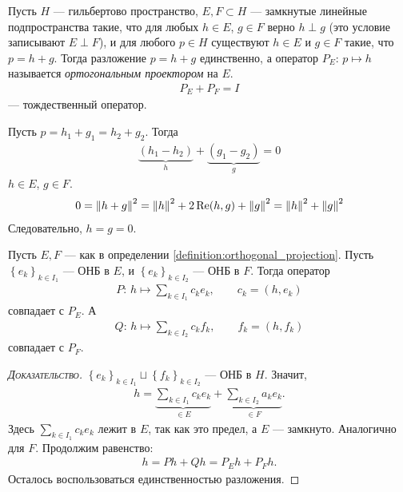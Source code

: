 \documentclass[../complex-analysis.tex]{subfiles}
\begin{document}
\begin{df}
 \label{definition:orthogonal_projection}
 Пусть $ H $ --- гильбертово пространство, $ E, F \subset H $ --- замкнутые линейные подпространства такие, что для любых $ h \in E $, $ g \in F $ верно $ h \perp g $ (это условие записывают $ E \perp F $), и для любого $ p \in H $ существуют $ h \in E $ и $ g \in F $ такие, что $ p = h + g $. Тогда разложение $ p = h + g $ единственно, а оператор $ P_E \colon\, p \mapsto h $ называется \textit{ортогональным проектором} на $ E $.
 \begin{align*}
  P_E + P_F = I
 \end{align*} --- тождественный оператор.
\end{df}
\begin{remrk}
 Пусть $ p = h_1 + g_1 = h_2 + g_2 $. Тогда
 \begin{align*}
  \underbrace{(h_1 - h_2)}_h + \underbrace{(g_1-g_2)}_g = 0
 \end{align*} $ h \in E $, $ g \in F $.
 \begin{align*}
  0 = \left\| h+g \right\|^{2} = \left\| h \right\|^{2} + 2 \operatorname{Re} (h,g) + \left\| g \right\|^{2} = \left\| h \right\|^{2} + \left\| g \right\|^{2}
 \end{align*} Следовательно, $ h=g=0 $.
\end{remrk}

\begin{thm}
  Пусть $ E,F $ --- как в определении \eqref{definition:orthogonal_projection}. Пусть $ \left\{e_k\right\}_{k\in I_1}  $ --- ОНБ в $ E $, и $ \left\{e_k\right\}_{k\in I_2}  $ --- ОНБ в $ F $. Тогда оператор \begin{align*}
  P \colon\, h \mapsto \sum_{k\in I_1} c_ke_k, \qquad c_k=(h,e_k)
 \end{align*} совпадает с $ P_E $. А
 \begin{align*}
  Q \colon\, h \mapsto \sum_{k \in I_2} c_kf_k, \qquad f_k=(h,f_k)
 \end{align*} совпадает с $ P_F $.
\end{thm}
\begin{proof}[\normalfont\textsc{Доказательство}]
 $ \left\{e_k\right\}_{k \in I_1} \sqcup \left\{f_k\right\}_{k \in I_2}  $ --- ОНБ в $ H $. Значит,
 \begin{align*}
  h = \underbrace{\sum_{k\in I_1}c_k e_k}_{\in E} + \underbrace{\sum_{k \in I_2} a_k e_k}_{\in F}.
 \end{align*} Здесь $ \sum_{k\in I_1}c_ke_k  $ лежит в $ E $, так как это предел, а $ E $ --- замкнуто. Аналогично для $ F $. Продолжим равенство:
 \begin{align*}
  h = P h + Q h = P_E h + P_F h.
 \end{align*} Осталось воспользоваться единственностью разложения.
\end{proof}
\end{document}
